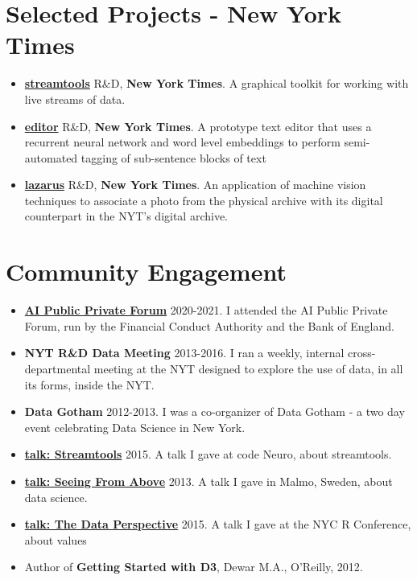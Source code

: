 \documentclass[line, overlapped]{res}
\begin{document}
\begin{resume}
\section{Selected Projects - New York Times}
\begin{itemize}
\item
	\href{https://github.com/nytlabs/streamtools}{\textbf{streamtools}} R\&D, \textbf{New York Times}. A graphical toolkit for working with live streams of data.
\item
	\href{http://nytlabs.com/projects/editor.html}{\textbf{editor}} R\&D, \textbf{New York Times}. A prototype text editor that uses a recurrent neural network and word level embeddings to perform semi-automated tagging of sub-sentence blocks of text
\item
	\href{http://nytlabs.com/projects/lazarus.html}{\textbf{lazarus}} R\&D, \textbf{New York Times}. An application of machine vision techniques to associate a photo from the physical archive with its digital counterpart in the NYT's digital archive.
\end{itemize}

\section{Community Engagement}

\begin{itemize}
\item
	\href{https://www.bankofengland.co.uk/research/fintech/ai-public-private-forum}{\textbf{AI Public Private Forum}} 2020-2021. I attended the AI Public
  Private Forum, run by the Financial Conduct Authority and the Bank of
  England.
\item
  \textbf{NYT R\&D Data Meeting} 2013-2016. I ran a weekly, internal
  cross-departmental meeting at the NYT designed to explore the use of
  data, in all its forms, inside the NYT.
\item
  \textbf{Data Gotham} 2012-2013. I was a co-organizer of Data Gotham -
  a two day event celebrating Data Science in New York.
\item
	\href{https://www.youtube.com/watch?v=23FgdEHOt0w}{\textbf{talk: Streamtools}} 2015. A talk  I gave at code Neuro, about streamtools.
\item
	\href{http://videos.theconference.se/mike-dewar-big-data-understand-and}{\textbf{talk: Seeing From Above}} 2013. A talk I gave in Malmo, Sweden, about data science.
\item
	\href{https://www.youtube.com/watch?v=Jsg4R9z\_Z7M}{\textbf{talk: The Data Perspective}} 2015. A talk I gave at the NYC R Conference, about values 
\item
  Author of \textbf{Getting Started with D3}, Dewar M.A., O'Reilly,
  2012.
\end{itemize}


\end{resume}
\end{document}
